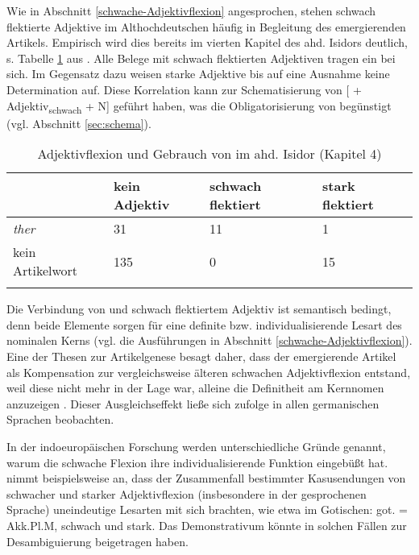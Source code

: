 Wie in Abschnitt \ref{schwache-Adjektivflexion} angesprochen, stehen schwach flektierte Adjektive im Althochdeutschen häufig in Begleitung des emergierenden Artikels. Empirisch wird dies bereits im vierten Kapitel des ahd. Isidors  deutlich, s. Tabelle \ref{tab:adjektive-flick2016} aus \textcite{Flick2018}. Alle Belege mit schwach flektierten Adjektiven tragen ein  bei sich. Im Gegensatz dazu weisen starke Adjektive bis auf eine Ausnahme keine Determination auf. Diese Korrelation kann zur Schematisierung von [ + Adjektiv\textsubscript{schwach} + N] geführt  haben, was die Obligatorisierung von  begünstigt (vgl. Abschnitt \ref{sec:schema}). 

\begin{table}
\centering
\begin{tabular}{llll}
\lsptoprule
                 & \textbf{kein Adjektiv} & \textbf{schwach flektiert} & \textbf{stark flektiert} \\ \midrule
\textit{ther}    & 31                     & 11                         & 1                        \\
kein Artikelwort & 135                    & 0                          & 15                       \\ \lspbottomrule
\end{tabular}
\caption{Adjektivflexion und Gebrauch von  im ahd. Isidor (Kapitel 4) \parencite{Flick2018}}
\label{tab:adjektive-flick2016}
\end{table}

Die Verbindung von  und schwach flektiertem Adjektiv ist semantisch bedingt, denn beide Elemente sorgen für eine definite bzw. individualisierende Lesart des nominalen Kerns  (vgl. die Ausführungen in Abschnitt \ref{schwache-Adjektivflexion}). Eine der Thesen zur Artikelgenese besagt daher, dass der emergierende Artikel als Kompensation zur vergleichsweise älteren schwachen Adjektivflexion entstand, weil diese nicht mehr in der Lage war, alleine die Definitheit am Kernnomen anzuzeigen \parencite{Heinrichs1954,Ebert1978,Kovari1984}. Dieser Ausgleichseffekt ließe sich \textcite[81]{Heinrichs1954} zufolge in allen germanischen Sprachen beobachten. 

In der indoeuropäischen Forschung werden unterschiedliche Gründe genannt, warum die schwache Flexion ihre individualisierende Funktion eingebüßt hat. \textcite[24]{Kovari1984} nimmt beispielsweise an, dass der Zusammenfall bestimmter Kasusendungen von schwacher und starker Adjektivflexion (insbesondere in der gesprochenen Sprache) uneindeutige Lesarten mit sich brachten, wie etwa im Gotischen: got.  = Akk.Pl.M, schwach und stark. Das Demonstrativum könnte in solchen Fällen zur Desambiguierung beigetragen haben. 

